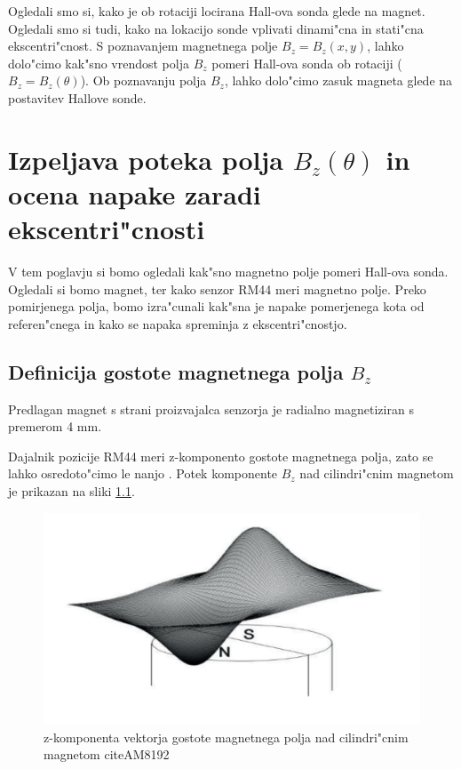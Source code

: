 Ogledali smo si, kako je ob rotaciji locirana Hall-ova sonda glede na magnet. Ogledali smo si tudi, kako na lokacijo sonde vplivati dinami"cna in stati"cna ekscentri"cnost. S poznavanjem magnetnega polje $B_z=B_z(x , y)$, lahko dolo"cimo kak"sno vrendost polja $B_z$ pomeri Hall-ova sonda ob rotaciji ($B_z=B_z(\theta)$). Ob poznavanju polja $B_z$, lahko dolo"cimo zasuk magneta glede na postavitev Hallove sonde.


\chapter{Izpeljava poteka polja $B_z(\theta)$ in ocena napake zaradi ekscentri"cnosti}

V tem poglavju si bomo ogledali kak"sno magnetno polje  pomeri Hall-ova sonda. Ogledali si bomo magnet, ter kako senzor RM44 meri magnetno polje. Preko pomirjenega polja, bomo izra"cunali kak"sna je napake pomerjenega kota od referen"cnega in kako se napaka spreminja z ekscentri"cnostjo.

\section{Definicija  gostote magnetnega polja $B_z$}

Predlagan magnet s strani proizvajalca senzorja je radialno magnetiziran s premerom 4 mm.

Dajalnik pozicije RM44 meri z-komponento gostote magnetnega polja, zato se lahko osredoto"cimo le nanjo \cite{AM8192}. Potek komponente $B_z$ nad cilindri"cnim magnetom je prikazan na sliki \ref{fig:magnetno_polje}.




\begin{figure}[h]
	\centering
		\includegraphics[width=0.75\columnwidth]{./Slike/magnetno_polje.jpg}
	\caption{z-komponenta vektorja gostote magnetnega polja nad cilindri"cnim magnetom citeAM8192}
	\label{fig:magnetno_polje}
\end{figure}


